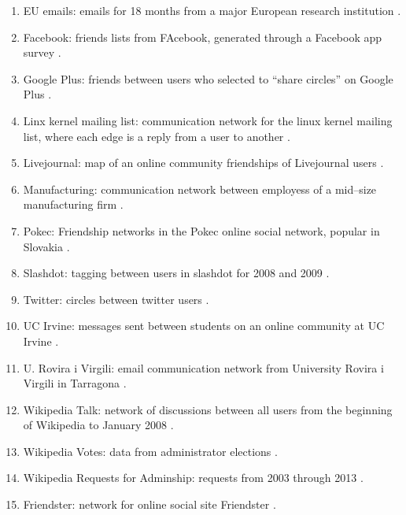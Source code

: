 \documentclass[3p,times]{elsarticle}
\begin{document}
\begin{enumerate}
    \item EU emails: emails for 18 months from a major European research institution \cite{EU}.
    
    \item Facebook: friends lists from FAcebook, generated through a Facebook app survey \cite{facebook}.
    
    \item Google Plus: friends between users who selected to ``share circles'' on Google Plus \cite{facebook}.
    
    \item Linx kernel mailing list: communication network for the linux kernel mailing list, where each edge is a reply from a user to another \cite{linux}.

    \item Livejournal: map of an online community friendships of Livejournal users \cite{livejournal}.

    \item Manufacturing: communication network between employess of a mid--size manufacturing firm \cite{manufacturing}.
    
    \item Pokec: Friendship networks in the Pokec online social network, popular in Slovakia \cite{pokec}.
    
    \item Slashdot: tagging between users in slashdot for 2008 and 2009 \cite{livejournal}.
    
    \item Twitter: circles between twitter users \cite{facebook}.
    
    \item UC Irvine: messages sent between students on an online community at UC Irvine \cite{irvine}.
 
    \item U. Rovira i Virgili: email communication network from University Rovira i Virgili in Tarragona \cite{URV}.

    \item Wikipedia Talk: network of discussions between all users from the beginning of Wikipedia to January 2008 \cite{wiki}.

    \item Wikipedia Votes: data from administrator elections \cite{wiki}.
    
    \item Wikipedia Requests for Adminship: requests from 2003 through 2013 \cite{wiki2}.

    \item Friendster: network for online social site Friendster \cite{friendster}.

\end{enumerate}
\end{document}
